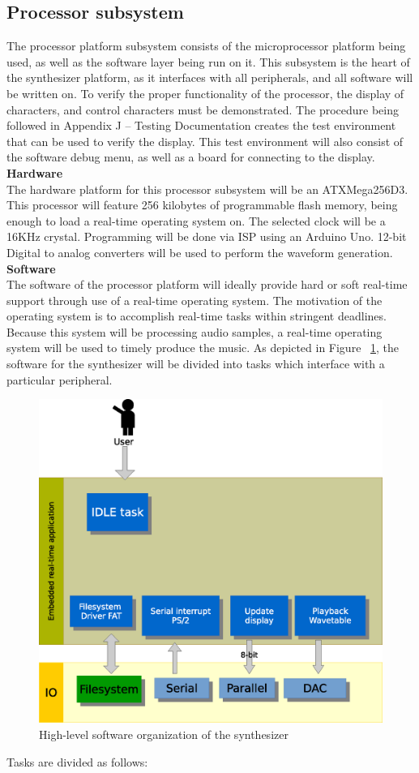 \documentclass[bibtotocnumbered,abstract=on,paper=a4,fontsize=12pt,parskip=on,halfparskip=on]{scrartcl}		%
\begin{document}
  \subsection{Processor subsystem}
    The processor platform subsystem consists of the microprocessor platform being used, as well as the software layer being run on it. This subsystem is the heart of the synthesizer platform, as it interfaces with all peripherals, and all software will be written on. To verify the proper functionality of the processor, the display of characters, and control characters must be demonstrated. The procedure being followed in Appendix J – Testing Documentation creates the test environment that can be used to verify the display. This test environment will also consist of the software debug menu, as well as a board for connecting to the display.
    \vskip 0.25cm
    \textbf{Hardware}\hfill \\
    The hardware platform for this processor subsystem will be an ATXMega256D3. This processor will feature 256 kilobytes of programmable flash memory, being enough to load a real-time operating system on. The selected clock will be a 16KHz crystal. Programming will be done via ISP using an Arduino Uno. 12-bit Digital to analog converters will be used to perform the waveform generation.
    \vskip 0.25cm
    \textbf{Software}\hfill \\
    The software of the processor platform will ideally provide hard or soft real-time support through use of a real-time operating system. The motivation of the operating system is to accomplish real-time tasks within stringent deadlines. \cite{0595375979}Because this system will be processing audio samples, a real-time operating system will be used to timely produce the music. As depicted in Figure ~\ref{fig:software0}, the software for the synthesizer will be divided into tasks which interface with a particular peripheral.
    \begin{figure}[H]
      \centering
        \includegraphics[width=0.65\linewidth]{img/fig_software0}
        \caption{High-level software organization of the synthesizer}
        \label{fig:software0}
    \end{figure}
Tasks are divided as follows:
\end{document}
